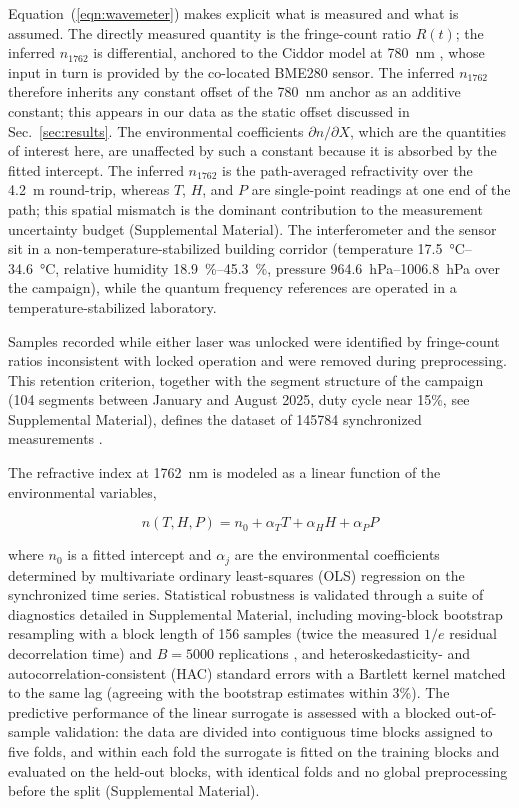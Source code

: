 \documentclass[aps,prapplied,reprint,groupedaddress,twocolumn,superscriptaddress,linenumbers]{revtex4-2}
\begin{document}
Equation~(\ref{eqn:wavemeter}) makes explicit what is measured and what is assumed. The directly measured quantity is the fringe-count ratio $R(t)$; the inferred $n_{1762}$ is differential, anchored to the Ciddor model at \SI{780}{\nano\meter} \cite{ciddor1996refractive}, whose input in turn is provided by the co-located BME280 sensor. The inferred $n_{1762}$ therefore inherits any constant offset of the 780~nm anchor as an additive constant; this appears in our data as the static offset discussed in Sec.~\ref{sec:results}. The environmental coefficients $\partial n/\partial X$, which are the quantities of interest here, are unaffected by such a constant because it is absorbed by the fitted intercept. The inferred $n_{1762}$ is the path-averaged refractivity over the \SI{4.2}{\meter} round-trip, whereas $T$, $H$, and $P$ are single-point readings at one end of the path; this spatial mismatch is the dominant contribution to the measurement uncertainty budget (Supplemental Material). The interferometer and the sensor sit in a non-temperature-stabilized building corridor (temperature \SIrange{17.5}{34.6}{\degreeCelsius}, relative humidity \SIrange{18.9}{45.3}{\percent}, pressure \SIrange{964.6}{1006.8}{\hecto\pascal} over the campaign), while the quantum frequency references are operated in a temperature-stabilized laboratory.

Samples recorded while either laser was unlocked were identified by fringe-count ratios inconsistent with locked operation and were removed during preprocessing. This retention criterion, together with the segment structure of the campaign (104 segments between January and August 2025, duty cycle near 15\%, see Supplemental Material), defines the dataset of \num{145784} synchronized measurements \cite{wu_2026_18800166}.

The refractive index at \SI{1762}{\nano\meter} is modeled as a linear function of the environmental variables,

\begin{equation}
n(T,H,P) = n_0 + \alpha_T T + \alpha_H H + \alpha_P P
\end{equation}

where $n_0$ is a fitted intercept and $\alpha_j$ are the environmental coefficients determined by multivariate ordinary least-squares (OLS) regression on the synchronized time series. Statistical robustness is validated through a suite of diagnostics detailed in Supplemental Material, including moving-block bootstrap resampling with a block length of 156 samples (twice the measured $1/e$ residual decorrelation time) and $B = 5000$ replications \cite{kunsch1989jackknife,politis1994stationary}, and heteroskedasticity- and autocorrelation-consistent (HAC) standard errors with a Bartlett kernel matched to the same lag \cite{newey1987hypothesis,andrews1991heteroskedasticity} (agreeing with the bootstrap estimates within 3\%). The predictive performance of the linear surrogate is assessed with a blocked out-of-sample validation: the data are divided into contiguous time blocks assigned to five folds, and within each fold the surrogate is fitted on the training blocks and evaluated on the held-out blocks, with identical folds and no global preprocessing before the split (Supplemental Material).
\end{document}
